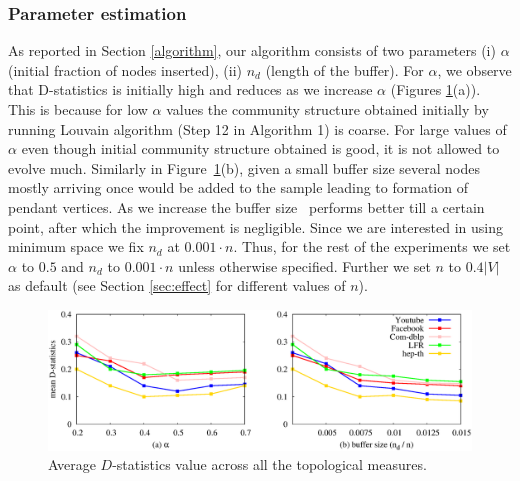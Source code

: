 \subsubsection{Parameter estimation}

As reported in Section \ref{algorithm}, our algorithm consists of two parameters (i) $\alpha$ (initial fraction of nodes inserted), (ii) $n_d$ (length of the buffer).
For $\alpha$, we observe that D-statistics is initially high and reduces as we increase $\alpha$ (Figures \ref{param_est}(a)). This is because for low $\alpha$ values the community structure obtained initially by running Louvain algorithm (Step 12 in Algorithm 1) is coarse. For large values of $\alpha$ even though initial community structure obtained is good, it is not allowed to evolve much. Similarly in Figure~\ref{param_est}(b), given a small buffer size several nodes mostly arriving once would be added to the sample leading to formation of pendant vertices. As we increase the buffer size \compas~performs better till a certain point, after which the improvement is negligible. Since we are interested in using minimum space we fix $n_d$ at $0.001\cdot n$. 
Thus, for the rest of the experiments we set $\alpha$ to $0.5$ and $n_d$ to $0.001\cdot n$ unless otherwise specified. Further we set $n$ to $0.4|V|$ as default (see Section \ref{sec:effect} for different values of $n$).

\begin{figure}[!h]
\centering
\includegraphics[scale=0.4]{./texfiles/Chapter_2/figures/param_estimate.eps}
\caption{\label{param_est}Average $D$-statistics value across all the topological measures.}
\end{figure}



